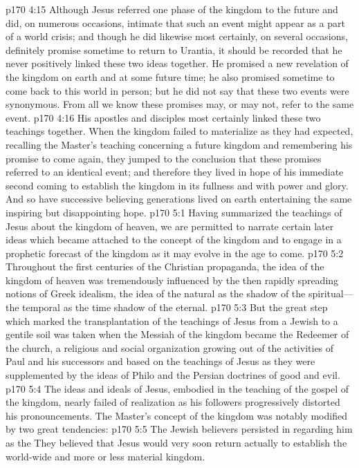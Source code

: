 \vs p170 4:15 Although Jesus referred one phase of the kingdom to the future and did, on numerous occasions, intimate that such an event might appear as a part of a world crisis; and though he did likewise most certainly, on several occasions, definitely promise sometime to return to Urantia, it should be recorded that he never positively linked these two ideas together. He promised a new revelation of the kingdom on earth and at some future time; he also promised sometime to come back to this world in person; but he did not say that these two events were synonymous. From all we know these promises may, or may not, refer to the same event.
\vs p170 4:16 His apostles and disciples most certainly linked these two teachings together. When the kingdom failed to materialize as they had expected, recalling the Master’s teaching concerning a future kingdom and remembering his promise to come again, they jumped to the conclusion that these promises referred to an identical event; and therefore they lived in hope of his immediate second coming to establish the kingdom in its fullness and with power and glory. And so have successive believing generations lived on earth entertaining the same inspiring but disappointing hope.
\vs p170 5:1 Having summarized the teachings of Jesus about the kingdom of heaven, we are permitted to narrate certain later ideas which became attached to the concept of the kingdom and to engage in a prophetic forecast of the kingdom as it may evolve in the age to come.
\vs p170 5:2 Throughout the first centuries of the Christian propaganda, the idea of the kingdom of heaven was tremendously influenced by the then rapidly spreading notions of Greek idealism, the idea of the natural as the shadow of the spiritual---the temporal as the time shadow of the eternal.
\vs p170 5:3 But the great step which marked the transplantation of the teachings of Jesus from a Jewish to a gentile soil was taken when the Messiah of the kingdom became the Redeemer of the church, a religious and social organization growing out of the activities of Paul and his successors and based on the teachings of Jesus as they were supplemented by the ideas of Philo and the Persian doctrines of good and evil.
\vs p170 5:4 The ideas and ideals of Jesus, embodied in the teaching of the gospel of the kingdom, nearly failed of realization as his followers progressively distorted his pronouncements. The Master’s concept of the kingdom was notably modified by two great tendencies:
\pc \vs p170 5:5 \bibnobreakspace The Jewish believers persisted in regarding him as the  They believed that Jesus would very soon return actually to establish the world\hyp{}wide and more or less material kingdom.

